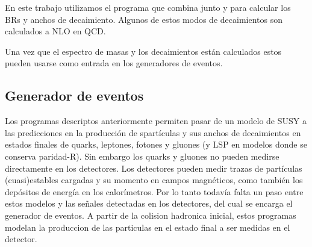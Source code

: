 En este trabajo utilizamos el programa {\susyhit} que combina
{\suspect} junto {\sdecay} y {\hdecay} para calcular los BRs y anchos de
decaimiento. Algunos de estos modos de decaimientos son calculados a NLO en QCD.






\vsp

Una vez que el espectro de masas y los decaimientos están calculados estos
pueden usarse como entrada en los generadores de eventos.




\subsection{Generador de eventos}

Los programas descriptos anteriormente permiten pasar de un modelo de SUSY a las
predicciones en la producción de spartículas y sus anchos de decaimientos en
estados finales de quarks, leptones, fotones y gluones (y LSP en modelos donde
se conserva paridad-R). Sin embargo los quarks y gluones no pueden medirse
directamente en los detectores. Los detectores pueden medir trazas de partículas
(cuasi)estables cargadas y su momento en campos magnéticos, como también los
depósitos de energía en los calorímetros. Por lo tanto todavía falta un paso
entre estos modelos y las señales detectadas en los detectores, del cual se
encarga el generador de eventos. A partir de la colision hadronica inicial,
estos programas modelan la produccion de las particulas en el estado final a ser
medidas en el detector.

